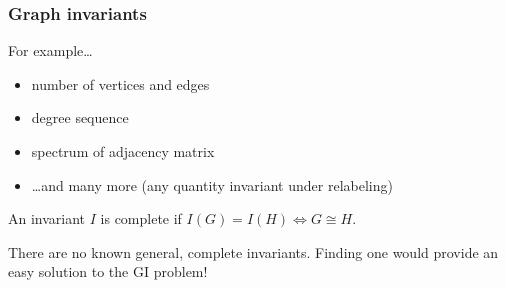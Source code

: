 \documentclass{beamer}
\begin{document}
\begin{frame}
  \frametitle{Graph invariants}
  For example\ldots
  \begin{itemize}
    \item number of vertices and edges
    \item degree sequence
    \item spectrum of adjacency matrix
    \item \ldots and many more (any quantity invariant under relabeling)
  \end{itemize}
  \pause
  \begin{definition}
    An invariant $I$ is \alert{complete} if $I(G)=I(H) \iff G \cong H$.
  \end{definition}
  There are no known general, complete invariants. Finding one would provide an
  easy solution to the GI problem!
\end{frame}
\end{document}
